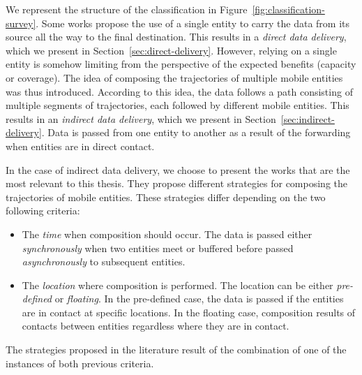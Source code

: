 We represent the structure of the classification in Figure~\ref{fig:classification-survey}. Some works propose the use of a single entity to carry the data from its source all the way to the final destination. This results in a \textit{direct data delivery}, which we present in Section~\ref{sec:direct-delivery}. However, relying on a single entity is somehow limiting from the perspective of the expected benefits (\eg capacity or coverage). The idea of composing the trajectories of multiple mobile entities was thus introduced. According to this idea, the data follows a path consisting of multiple segments of trajectories, each followed by different mobile entities. This results in an \textit{indirect data delivery}, which we present in Section~\ref{sec:indirect-delivery}. Data is passed from one entity to another as a result of the forwarding when entities are in direct contact.

In the case of indirect data delivery, we choose to present the works that are the most relevant to this thesis. They propose different strategies for composing the trajectories of mobile entities. These strategies differ depending on the two following criteria:

\begin{itemize}
  
    \item The \textit{time} when composition should occur. The data is passed either \textit{synchronously} when two entities meet or buffered before passed \textit{asynchronously} to subsequent entities.  

    \item The \textit{location} where composition is performed. The location can be either \textit{pre-defined} or \textit{floating}. In the pre-defined case, the data is passed if the entities are in contact at specific locations. In the floating case, composition results of contacts between entities regardless where they are in contact.

\end{itemize}

The strategies proposed in the literature result of the combination of one of the instances of both previous criteria. 


